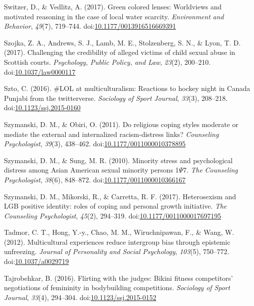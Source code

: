 \documentclass[english,man]{apa6}
\begin{document}
\hypertarget{ref-Switzer2017}{}
Switzer, D., \& Vedlitz, A. (2017). Green colored lenses: Worldviews and
motivated reasoning in the case of local water scarcity.
\emph{Environment and Behavior}, \emph{49}(7), 719--744.
doi:\href{https://doi.org/10.1177/0013916516669391}{10.1177/0013916516669391}

\hypertarget{ref-Szojka2017}{}
Szojka, Z. A., Andrews, S. J., Lamb, M. E., Stolzenberg, S. N., \& Lyon,
T. D. (2017). Challenging the credibility of alleged victims of child
sexual abuse in Scottish courts. \emph{Psychology, Public Policy, and
Law}, \emph{23}(2), 200--210.
doi:\href{https://doi.org/10.1037/law0000117}{10.1037/law0000117}

\hypertarget{ref-Szto2016}{}
Szto, C. (2016). \#LOL at multiculturalism: Reactions to hockey night in
Canada Punjabi from the twitterverse. \emph{Sociology of Sport Journal},
\emph{33}(3), 208--218.
doi:\href{https://doi.org/10.1123/ssj.2015-0160}{10.1123/ssj.2015-0160}

\hypertarget{ref-Szymanski2011}{}
Szymanski, D. M., \& Obiri, O. (2011). Do religious coping styles
moderate or mediate the external and internalized racism-distress links?
\emph{Counseling Psychologist}, \emph{39}(3), 438--462.
doi:\href{https://doi.org/10.1177/0011000010378895}{10.1177/0011000010378895}

\hypertarget{ref-Szymanski2010}{}
Szymanski, D. M., \& Sung, M. R. (2010). Minority stress and
psychological distress among Asian American sexual minority persons
1\(\Psi\)7. \emph{The Counseling Psychologist}, \emph{38}(6), 848--872.
doi:\href{https://doi.org/10.1177/0011000010366167}{10.1177/0011000010366167}

\hypertarget{ref-Szymanski2017}{}
Szymanski, D. M., Mikorski, R., \& Carretta, R. F. (2017). Heterosexism
and LGB positive identity: roles of coping and personal growth
initiative. \emph{The Counseling Psychologist}, \emph{45}(2), 294--319.
doi:\href{https://doi.org/10.1177/0011000017697195}{10.1177/0011000017697195}

\hypertarget{ref-Tadmor2012}{}
Tadmor, C. T., Hong, Y.-y., Chao, M. M., Wiruchnipawan, F., \& Wang, W.
(2012). Multicultural experiences reduce intergroup bias through
epistemic unfreezing. \emph{Journal of Personality and Social
Psychology}, \emph{103}(5), 750--772.
doi:\href{https://doi.org/10.1037/a0029719}{10.1037/a0029719}

\hypertarget{ref-Tajrobehkar2016}{}
Tajrobehkar, B. (2016). Flirting with the judges: Bikini fitness
competitors' negotiations of femininity in bodybuilding competitions.
\emph{Sociology of Sport Journal}, \emph{33}(4), 294--304.
doi:\href{https://doi.org/10.1123/ssj.2015-0152}{10.1123/ssj.2015-0152}
\end{document}
